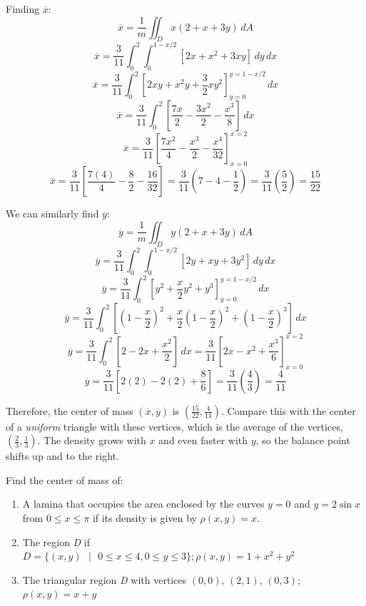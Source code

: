 \begin{Worked}
\begin{Solution}
Finding $\overline{x}$:
$$\overline{x} = \frac{1}{m} \iint_{\textit{D}} x \left( 2 + x + 3y \right) 
\,dA$$
$$\overline{x} = \frac{3}{11} \int_0^2 \int_0^{1 - x/2} \left[ 2x + x^2 + 3xy 
\right] \,dy \,dx$$
$$\overline{x} = \frac{3}{11} \int_0^2 \left[ 2xy + x^2y + \frac{3}{2}xy^2 
\right]_{y = 0}^{y = 1 - x/2} \,dx$$
$$\overline{x} = \frac{3}{11} \int_0^2 \left[ \frac{7x}{2} - \frac{3x^2}{2} - 
\frac{x^3}{8} \right]\,dx$$
$$\overline{x} = \frac{3}{11} \left[ \frac{7x^2}{4} - \frac{x^3}{2} - \frac{x
^4}{32} \right]_{x = 0}^{x = 2}$$
$$\overline{x} = \frac{3}{11} \left[ \frac{7(4)}{4} - \frac{8}{2} - \frac{16}{
32} \right] = \frac{3}{11} \left( 7 - 4 - \frac{1}{2} \right) = \frac{3}{11} 
\left( \frac{5}{2} \right) = \frac{15}{22}$$

We can similarly find $\overline{y}$:
$$\overline{y} = \frac{1}{m} \iint_{\textit{D}} y \left(2 + x + 3y \right)
\,dA$$
$$\overline{y} = \frac{3}{11} \int_0^2 \int_0^{1 - x/2} \left[ 2y + xy + 3y^2 
\right]\,dy\,dx$$
$$\overline{y} = \frac{3}{11} \int_0^2 \left[ y^2 + \frac{x}{2}y^2 + y^3 
\right]_{y = 0}^{y = 1 - x/2} \,dx$$
$$\overline{y} = \frac{3}{11} \int_0^2 \left[ \left(1 - \frac{x}{2} \right)^2 
+ \frac{x}{2} \left( 1 - \frac{x}{2} \right)^2 + \left( 1 - \frac{x}{2} \right)
^3 \right] \,dx$$
$$\overline{y} = \frac{3}{11} \int_0^2 \left[ 2 - 2x + \frac{x^2}{2} \right]
\,dx = \frac{3}{11} \left[ 2x - x^2 + \frac{x^3}{6} \right]_{x = 0}^{x = 2}$$
$$\overline{y} = \frac{3}{11} \left[ 2(2) - 2(2) + \frac{8}{6} \right] = \frac{
3}{11} \left( \frac{4}{3} \right) = \frac{4}{11}$$

Therefore, the center of mass $(\overline{x}, \overline{y})$ is $(\frac{15}{22
}, \frac{4}{11})$. Compare this with the center of a \emph{uniform} triangle
with these vertices, which is the average of the vertices, $(\frac{2}{3}, \frac{1}{3})$.
The density grows with $x$ and even faster with $y$, so the balance point
shifts up and to the right.
\end{Solution}
\end{Worked}

\begin{Exercise}[title = {Center of Mass}, label = c_of_m]
Find the center of mass of: 
\begin{enumerate}
\item A lamina that occupies the area enclosed by the 
curves $y = 0$ and $y = 2\sin{x}$ from $0 \leq x \leq \pi$ if its density is 
given by $\rho (x,y) = x$.
\item The region \textit{D} if $\textit{D} = \{(x, y)\text{ }|\text{ } 0 \leq x
\leq 4, 0 \leq y \leq 3 \}; \rho (x, y) = 1 + x^2 + y^2$
\item The triangular region \textit{D} with vertices $(0, 0)$, $(2, 1)$, 
$(0, 3)$; $\rho (x, y) = x + y$
\end{enumerate}
\vspace{100mm}
\end{Exercise}

